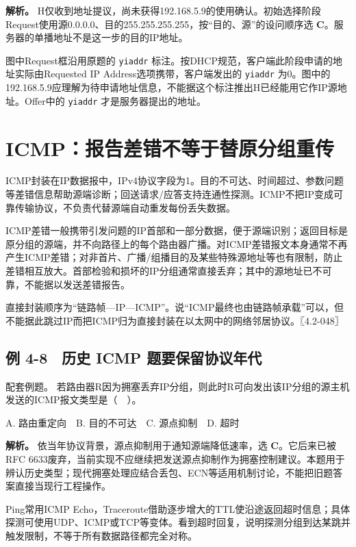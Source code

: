 \textbf{解析。} H仅收到地址提议，尚未获得192.168.5.9的使用确认。初始选择阶段Request使用源0.0.0.0、目的255.255.255.255，按``目的、源''的设问顺序选 \textbf{C}。服务器的单播地址不是这一步的目的IP地址。

图中Request框沿用原题的 \texttt{yiaddr} 标注。按DHCP规范，客户端此阶段申请的地址实际由Requested IP Address选项携带，客户端发出的 \texttt{yiaddr} 为0。图中的192.168.5.9应理解为待申请地址信息，不能据这个标注推出H已经能用它作IP源地址。Offer中的 \texttt{yiaddr} 才是服务器提出的地址。

\section{ICMP：报告差错不等于替原分组重传}\label{CN04-13}

ICMP封装在IP数据报中，IPv4协议字段为1。目的不可达、时间超过、参数问题等差错信息帮助源端诊断；回送请求/应答支持连通性探测。ICMP不把IP变成可靠传输协议，不负责代替源端自动重发每份丢失数据。

ICMP差错一般携带引发问题的IP首部和一部分数据，便于源端识别；返回目标是原分组的源端，并不向路径上的每个路由器广播。对ICMP差错报文本身通常不再产生ICMP差错；对非首片、广播/组播目的及某些特殊源地址等也有限制，防止差错相互放大。首部检验和损坏的IP分组通常直接丢弃；其中的源地址已不可靠，不能据以发送差错报告。

直接封装顺序为``链路帧---IP---ICMP''。说``ICMP最终也由链路帧承载''可以，但不能据此跳过IP而把ICMP归为直接封装在以太网中的网络邻居协议。〖4.2-048〗

\subsection{例 4-8　历史 ICMP 题要保留协议年代}\label{CN04-ex8}

\begin{example}[配套例题]

配套例题。 若路由器R因为拥塞丢弃IP分组，则此时R可向发出该IP分组的源主机发送的ICMP报文类型是（　）。

A. 路由重定向　B. 目的不可达　C. 源点抑制　D. 超时

\end{example}

\textbf{解析。} 依当年协议背景，源点抑制用于通知源端降低速率，选 \textbf{C}。它后来已被RFC 6633废弃，当前实现不应继续把发送源点抑制作为拥塞控制建议。本题用于辨认历史类型；现代拥塞处理应结合丢包、ECN等适用机制讨论，不能把旧题答案直接当现行工程操作。

Ping常用ICMP Echo，Traceroute借助逐步增大的TTL使沿途返回超时信息；具体探测可使用UDP、ICMP或TCP等变体。看到超时回复，说明探测分组到达某跳并触发限制，不等于所有数据路径都完全对称。

